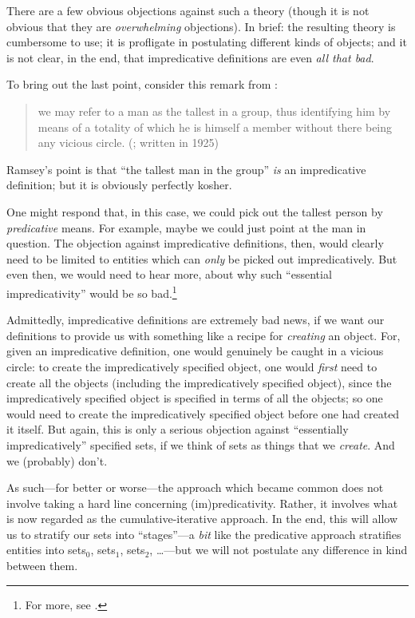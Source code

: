 \documentclass[../../../include/open-logic-section]{subfiles}
\begin{document}
There are a few obvious objections against such a theory (though it is
not obvious that they are \emph{overwhelming} objections). In brief:
the resulting theory is cumbersome to use; it is profligate in
postulating different kinds of objects; and it is not clear, in the
end, that impredicative definitions are even  \emph{all that bad}. 
	
To bring out the last point, consider this remark from
\citeauthor{Ramsey1925}:
\begin{quote}
	we may refer to a man as the tallest in a group, thus identifying him by means of a totality of which he is himself a member without there being any vicious circle. (\citealt{Ramsey1925}; written in 1925)
\end{quote}
Ramsey's point is that ``the tallest man in the group'' \emph{is} an
impredicative definition; but it is obviously perfectly kosher. 

One might respond that, in this case, we could pick out the tallest
person by \emph{predicative} means. For example, maybe we could just
point at the man in question. The objection against impredicative
definitions, then, would clearly need to be limited to entities which
can \emph{only} be picked out impredicatively. But even then, we would
need to hear more, about why such ``essential impredicativity'' would
be so bad.\footnote{For more, see \citet{LinneboPID}.}

Admittedly, impredicative definitions are extremely bad news, if we
want our definitions to provide us with something like a recipe for
\emph{creating} an object. For, given an impredicative definition, one
would genuinely be caught in a vicious circle: to create the
impredicatively specified object, one would \emph{first} need to
create all the objects (including the impredicatively specified
object), since the impredicatively specified object is specified in
terms of all the objects; so one would need to create the
impredicatively specified object before one had created it itself. But
again, this is only a serious objection against ``essentially
impredicatively'' specified sets, if we think of sets as things that
we \emph{create}. And we (probably) don't.

As such---for better or worse---the approach which became common does
not involve taking a hard line concerning (im)predicativity. Rather,
it involves what is now regarded as the cumulative-iterative approach.
In the end, this will allow us to stratify our sets into
``stages''---a \emph{bit} like the predicative approach stratifies
entities into sets$_0$, sets$_1$, sets$_2$, \ldots---but we will not
postulate any difference in kind between them. 
\end{document}
